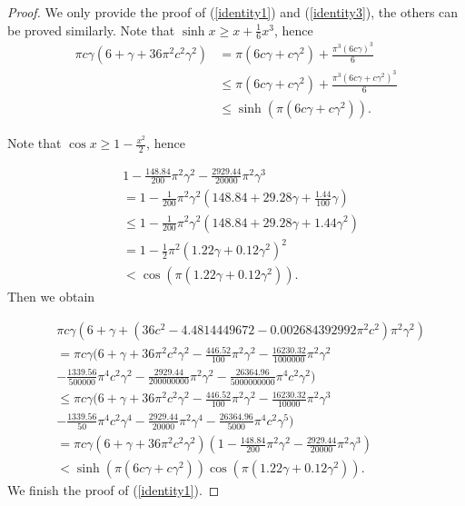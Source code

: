 \documentclass[10pt,a4paper]{amsart}
\begin{document}
\begin{proof}
We only provide the proof of (\ref{identity1}) and (\ref{identity3}), the others can be proved similarly.  Note that 
$\sinh x\geq x+\frac{1}{6}x^{3}$, hence
\begin{align}
\pi c\gamma\left(  6+\gamma+36\pi^{2}c^{2}\gamma^{2}\right)  &=\pi(6c\gamma+c\gamma^{2})+\frac{\pi^{3}(6c\gamma)^{3}}{6}\\\nonumber
&\leq\pi(6c\gamma+c\gamma^{2})+\frac{\pi^{3}(6c\gamma+c\gamma^{2})^{3}}{6}\\\nonumber
&\leq\sinh(\pi(6c\gamma+c\gamma^{2})).
\end{align}

Note that $\cos x\geq 1-\frac{x^{2}}{2}$, hence

\begin{align}
&1-\frac{148.84}{200}\pi^{2}\gamma^{2}-\frac{2929.44}{20000}\pi^{2}\gamma^{3}\\\nonumber
&=1-\frac{1}{200}\pi^{2}\gamma^{2}(148.84+29.28\gamma+\frac{1.44}{100}%
\gamma)\\\nonumber
&\leq1-\frac{1}{200}\pi^{2}\gamma^{2}(148.84+29.28\gamma+1.44\gamma
^{2})\\\nonumber
&=1-\frac{1}{2}\pi^{2}(1.22\gamma+0.12\gamma^{2})^{2}\\\nonumber
&<\cos(\pi(1.22\gamma+0.12\gamma^{2})).
\end{align}
Then we obtain

\begin{align}
&\pi c\gamma(6+\gamma+(36c^{2}-4.4814449672-0.002684392992\pi^{2}c^{2})\pi
^{2}\gamma^{2})\\\nonumber
&=\pi c\gamma(6+\gamma+36\pi^{2}c^{2}\gamma^{2}-\frac{446.52}{100}\pi
^{2}\gamma^{2}-\frac{16230.32}{1000000}\pi^{2}\gamma^{2}\\\nonumber
&-\frac{1339.56}%
{500000}\pi^{4}c^{2}\gamma^{2}-\frac{2929.44}{200000000}\pi^{2}\gamma
^{2}-\frac{26364.96}{5000000000}\pi^{4}c^{2}\gamma^{2})\\\nonumber
&\leq\pi c\gamma(6+\gamma+36\pi^{2}c^{2}\gamma^{2}-\frac{446.52}{100}\pi
^{2}\gamma^{2}-\frac{16230.32}{10000}\pi^{2}\gamma^{3}\\\nonumber
&-\frac{1339.56}{50}%
\pi^{4}c^{2}\gamma^{4}-\frac{2929.44}{20000}\pi^{2}\gamma^{4}-\frac
{26364.96}{5000}\pi^{4}c^{2}\gamma^{5})\\\nonumber
&=\pi c\gamma\left(  6+\gamma+36\pi^{2}c^{2}\gamma^{2}\right)  (1-\frac
{148.84}{200}\pi^{2}\gamma^{2}-\frac{2929.44}{20000}\pi^{2}\gamma^{3})\\\nonumber
&<\sinh(\pi(6c\gamma+c\gamma^{2}))\cos(\pi(1.22\gamma+0.12\gamma^{2})).
\end{align}
We finish the proof of (\ref{identity1}).



\end{proof}
\end{document}
